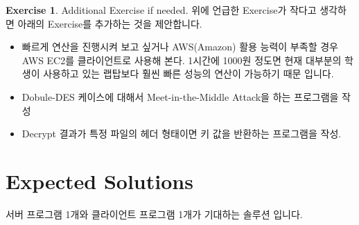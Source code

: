 \documentclass[a4paper, 11pt]{article}
\theoremstyle{definition}
\newtheorem{exercise}{Exercise}
\begin{document}
\begin{exercise} Additional Exercise if needed.
\newline
위에 언급한 Exercise가 작다고 생각하면 아래의 Exercise를 추가하는 것을 제안합니다.
\begin{itemize}
\item 빠르게 연산을 진행시켜 보고 싶거나 AWS(Amazon) 활용 능력이 부족할 경우 AWS EC2를 클라이언트로 사용해 본다. 1시간에 1000원 정도면 현재 대부분의 학생이 사용하고 있는 랩탑보다 훨씬 빠른 성능의 연산이 가능하기 때문 입니다.
\item Dobule-DES 케이스에 대해서 Meet-in-the-Middle Attack을 하는 프로그램을 작성
\item Decrypt 결과가 특정 파일의 헤더 형태이면 키 값을 반환하는 프로그램을 작성.
\end{itemize}

\end{exercise}

\section{Expected Solutions}
서버 프로그램 1개와 클라이언트 프로그램 1개가 기대하는 솔루션 입니다.



\end{document}
